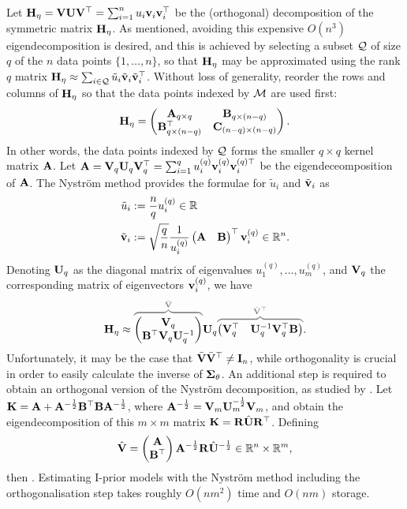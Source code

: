 Let ${\mathbf H}_\eta = {\mathbf V}{\mathbf U}{\mathbf V}^\top = \sum_{i=1}^n u_i {\mathbf v}_i {\mathbf v}_i^\top$ be the (orthogonal) decomposition of the symmetric matrix ${\mathbf H}_\eta$.
As mentioned, avoiding this expensive $O(n^3)$ eigendecomposition is desired, and this is achieved by selecting a subset ${\mathcal Q}$ of size $q$ of the $n$ data points $\{1,\dots,n \}$, so that ${\mathbf H}_\eta$ may be approximated using the rank $q$ matrix ${\mathbf H}_\eta \approx \sum_{i\in{\mathcal Q}} \tilde u_i \tilde{{\mathbf v}}_i\tilde{{\mathbf v}}_i^\top$.
Without loss of generality, reorder the rows and columns of ${\mathbf H}_\eta$ so that the data points indexed by ${\mathcal M}$ are used first:
%
\[
  {\mathbf H}_\eta =
  \begin{pmatrix}
    {\mathbf A}_{q\times q}         & {\mathbf B}_{q \times (n-q)} \\
    {\mathbf B}_{q \times (n-q)}^\top  & {\mathbf C}_{(n-q) \times (n-q)} \\
  \end{pmatrix}.
\]
%
In other words, the data points indexed by ${\mathcal Q}$ forms the smaller $q\times q$ kernel matrix ${\mathbf A}$. 
Let ${\mathbf A} = {\mathbf V}_q{\mathbf U}_q{\mathbf V}_q^\top = \sum_{i=1}^q u_i^{(q)}{\mathbf v}_i^{(q)}{\mathbf v}_i^{(q)\top}$ be the eigendeceomposition of ${\mathbf A}$.
The Nyström method provides the formulae for $\tilde u_i$ and $\tilde{{\mathbf v}}_i$ \citep[§8.1, equations 8.2 and 8.3]{rasmussen2006gaussian} as
\begin{align*}
  \tilde u_i &:= \frac{n}{q} u_i^{(q)} \in \mathbb{R} \\
  \tilde {{\mathbf v}}_i &:= \sqrt{\frac{q}{n}} \frac{1}{u_i^{(q)}}
  \begin{pmatrix}
    {\mathbf A} & {\mathbf B}
  \end{pmatrix}^\top
  {\mathbf v}_i^{(q)} \in \mathbb{R}^n.
\end{align*}
Denoting ${\mathbf U}_q$ as the diagonal matrix of eigenvalues $u_1^{(q)},\dots,u_m^{(q)}$, and ${\mathbf V}_q$ the corresponding matrix of eigenvectors ${\mathbf v}_i^{(q)}$, we have
\[
  \bH_\eta \approx
  \myoverbrace{
  \begin{pmatrix}
    \bV_q \\
    \bB^\top\bV_q\bU_q^{-1}
  \end{pmatrix}
  }{\bar\bV}
  \bU_q
  \myoverbrace{
  \begin{pmatrix}
    \bV_q^\top & \bU_q^{-1}\bV_q^\top\bB
  \end{pmatrix}
  }{\bar\bV^\top}
  .
\]
Unfortunately, it may be the case that $\bar{{\mathbf V}}\bar{{\mathbf V}}^\top \neq {\mathbf I}_n$, while orthogonality is crucial in order to easily calculate the inverse of ${\bm\Sigma}_\theta$.
An additional step is required to obtain an orthogonal version of the Nyström decomposition, as studied by \citet{fowlkes2001efficient}.
 Let ${\mathbf K} = {\mathbf A} + {\mathbf A}^{-\frac{1}{2}}{\mathbf B}^\top{\mathbf B}{\mathbf A}^{-\frac{1}{2}}$, where ${\mathbf A}^{-\frac{1}{2}} = {\mathbf V}_m{\mathbf U}_m^{-\frac{1}{2}}{\mathbf V}_m$, and obtain the eigendecomposition of this $m\times m$ matrix ${\mathbf K} = {\mathbf R}\hat{{\mathbf U}}{\mathbf R}^\top$.
 Defining
 \[
   \hat{{\mathbf V}} = 
   \begin{pmatrix}
     {\mathbf A} \\
     {\mathbf B}^\top
   \end{pmatrix}
   {\mathbf A}^{-\frac{1}{2}}{\mathbf R}\hat{{\mathbf U}}^{-\frac{1}{2}} \in \mathbb{R}^n \times \mathbb{R}^m,
 \]
 then 
 .
 Estimating I-prior models with the Nystr\"om method including the orthogonalisation step takes roughly $O(nm^2)$ time and $O(nm)$ storage.
 
